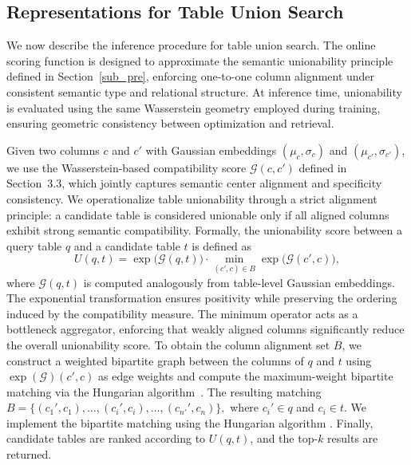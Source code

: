 \subsection{Representations for Table Union Search}
\label{sub_sec_onl}
We now describe the inference procedure for table union search. 
The online scoring function is designed to approximate the semantic unionability principle defined in Section~\ref{sub_pre}, enforcing one-to-one column alignment under consistent semantic type and relational structure. At inference time, unionability is evaluated using the same Wasserstein geometry employed during training, ensuring geometric consistency between optimization and retrieval.


Given two columns $c$ and $c'$ with Gaussian embeddings $(\mu_c,\sigma_c)$ and $(\mu_{c'},\sigma_{c'})$, we use the Wasserstein-based compatibility score $\mathcal{G}(c,c')$ defined in Section~3.3, which jointly captures semantic center alignment and specificity consistency. We operationalize table unionability through a strict alignment principle: a candidate table is considered unionable only if all aligned columns exhibit strong semantic compatibility. 
Formally, the unionability score between a query table $q$ and a candidate table $t$ is defined as
\begin{equation}
\label{eq_union}
    U(q,t)=\exp\!\big(\mathcal{G}(q,t)\big)\cdot\min_{(c',c)\in B}
\exp\!\big(\mathcal{G}(c',c)\big),
\end{equation}
where $\mathcal{G}(q,t)$ is computed analogously from table-level Gaussian embeddings. 
The exponential transformation ensures positivity while preserving the ordering induced by the compatibility measure. 
The minimum operator acts as a bottleneck aggregator, enforcing that weakly aligned columns significantly reduce the overall unionability score. To obtain the column alignment set $B$, we construct a weighted bipartite graph between the columns of $q$ and $t$ using $\exp(\mathcal{G})(c',c)$ as edge weights and compute the maximum-weight bipartite matching via the Hungarian algorithm~\cite{kuhn1955hungarian}. 
The resulting matching {\small\(
B=
\big\{
(c_1',c_1),\dots,(c_i',c_i),\dots,
(c_{{n'}}',c_{{n}})
\big\},
\)}
where $c_i'\in q$ and $c_i\in t$. We implement the bipartite matching using the Hungarian algorithm \cite{kuhn1955hungarian}. 
Finally, candidate tables are ranked according to $U(q,t)$, and the top-$k$ results are returned.
